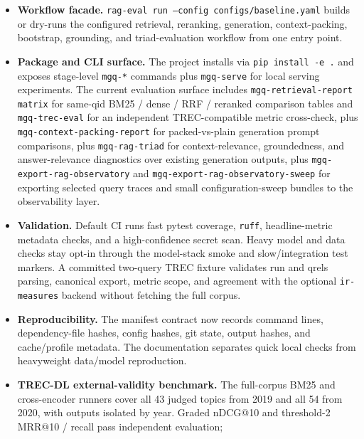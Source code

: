 \documentclass[11pt,a4paper]{article}
\makeatletter
\newcommand{\mrr}{MRR@10}
\newcommand{\ndcg}{nDCG@10}
\newcommand{\bmtwofive}{BM25}
\makeatother
\begin{document}
\begin{itemize}
  \item \textbf{Workflow facade.}  \texttt{rag-eval run --config
        configs/baseline.yaml} builds or dry-runs the configured
        retrieval, reranking, generation, context-packing,
        bootstrap, grounding, and triad-evaluation workflow from one
        entry point.
  \item \textbf{Package and CLI surface.}  The project installs via
        \texttt{pip install -e .} and exposes stage-level
        \texttt{mgq-*} commands plus \texttt{mgq-serve} for local
        serving experiments.  The current evaluation surface includes
        \texttt{mgq-retrieval-report matrix} for same-qid
        \bmtwofive{} / dense / RRF / reranked comparison tables and
        \texttt{mgq-trec-eval} for an independent TREC-compatible
        metric cross-check, plus
        \texttt{mgq-context-packing-report} for packed-vs-plain
        generation prompt comparisons, plus
        \texttt{mgq-rag-triad} for context-relevance, groundedness,
        and answer-relevance diagnostics over existing generation
        outputs, plus \texttt{mgq-export-rag-observatory} and
        \texttt{mgq-export-rag-observatory-sweep} for exporting
        selected query traces and small configuration-sweep bundles to
        the observability layer.
  \item \textbf{Validation.}  Default CI runs fast pytest coverage,
        \texttt{ruff}, headline-metric metadata checks, and a
        high-confidence secret scan.  Heavy model and data checks stay
        opt-in through the model-stack smoke and slow/integration test
        markers.  A committed two-query TREC fixture validates run and
        qrels parsing, canonical export, metric scope, and agreement
        with the optional \texttt{ir-measures} backend without fetching
        the full corpus.
  \item \textbf{Reproducibility.}  The manifest contract now records
        command lines, dependency-file hashes, config hashes, git
        state, output hashes, and cache/profile metadata.  The
        documentation separates quick local checks from heavyweight
        data/model reproduction.
  \item \textbf{TREC-DL external-validity benchmark.}  The full-corpus
        \bmtwofive{} and cross-encoder runners cover all 43 judged
        topics from 2019 and all 54 from 2020, with outputs isolated
        by year.  Graded \ndcg{} and threshold-2 \mrr{} / recall
         pass independent evaluation; 

\end{itemize}
\end{document}
